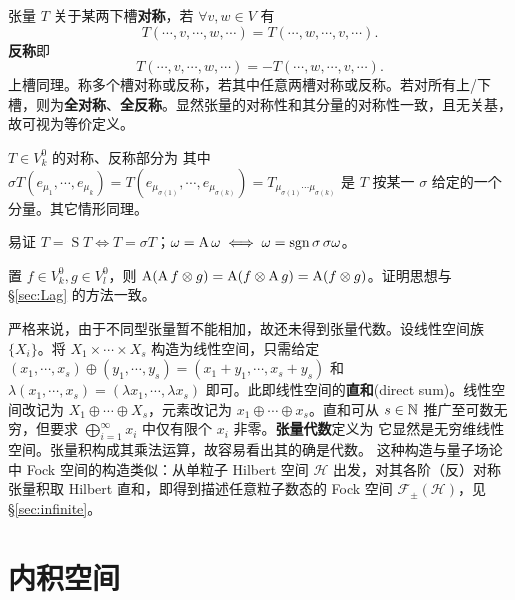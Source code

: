 \begin{definition}
    张量 $T$ 关于某两下槽\textbf{对称}，若 $\forall v,w\in V$ 有
    \[
    T(\cdots,v,\cdots,w,\cdots)=T(\cdots,w,\cdots,v,\cdots).
    \]
    \textbf{反称}即
    \[
    T(\cdots,v,\cdots,w,\cdots)=-T(\cdots,w,\cdots,v,\cdots).
    \]
    上槽同理。称多个槽对称或反称，若其中任意两槽对称或反称。若对所有上/下槽，则为\textbf{全对称}、\textbf{全反称}。显然张量的对称性和其分量的对称性一致，且无关基，故可视为等价定义。

    $T\in V^0_k$ 的对称、反称部分为
其中 $\sigma T(e_{\mu_1},\cdots,e_{\mu_k})=T(e_{\mu_{\sigma(1)}},\cdots,e_{\mu_{\sigma(k)}})=T_{\mu_{\sigma(1)}\cdots\mu_{\sigma(k)}}$ 是 $T$ 按某一 $\sigma$ 给定的一个分量。其它情形同理。
\end{definition}

\begin{theorem}
    易证 $T=\operatorname{S} T\iff T=\sigma T$；$\omega=\operatorname{A}\omega\iff\omega=\operatorname{sgn}\sigma\,\sigma\omega$。
\end{theorem}

\begin{theorem}
    置 $f\in V^0_k,g\in V^0_l$，则 $\operatorname{A}(\operatorname{A} f\otimes g)=\operatorname{A}(f\otimes\operatorname{A} g)=\operatorname{A}(f\otimes g)$。证明思想与 \S\ref{sec:Lag} 的方法一致。
\end{theorem}

严格来说，由于不同型张量暂不能相加，故还未得到张量代数。设线性空间族 $\{X_i\}$。将 $X_1\times\cdots\times X_s$ 构造为线性空间，只需给定 $(x_1,\cdots,x_s)\oplus(y_1,\cdots,y_s)=(x_1+y_1,\cdots,x_s+y_s)$ 和 $\lambda(x_1,\cdots,x_s)=(\lambda x_1,\cdots,\lambda x_s)$ 即可。此即线性空间的\textbf{直和}(direct sum)。线性空间改记为 $X_1\oplus\cdots\oplus X_s$，元素改记为 $x_1\oplus\cdots\oplus x_s$。直和可从 $s\in\mathbb{N}$ 推广至可数无穷，但要求 $\bigoplus_{i=1}^\infty x_i$ 中仅有限个 $x_i$ 非零。\textbf{张量代数}定义为
它显然是无穷维线性空间。张量积构成其乘法运算，故容易看出其的确是代数。
这种构造与量子场论中 Fock 空间的构造类似：从单粒子 Hilbert 空间 $\mathscr H$ 出发，对其各阶（反）对称张量积取 Hilbert 直和，即得到描述任意粒子数态的 Fock 空间 $\mathscr F_\pm(\mathscr H)$，见 \S\ref{sec:infinite}。

\section{内积空间}

